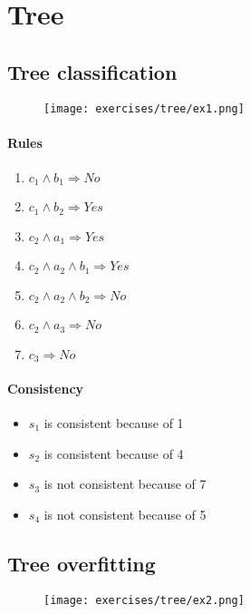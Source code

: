 \section{Tree}

\subsection{Tree classification}
\begin{figure}[H]
    \centering
    \texttt{[image: exercises/tree/ex1.png]}
\end{figure}

\paragraph{Rules}
\begin{enumerate}

\item $c_1 \wedge b_1 \Rightarrow No $
\item $c_1 \wedge b_2 \Rightarrow Yes $
\item $c_2 \wedge a_1 \Rightarrow Yes $
\item $c_2 \wedge a_2 \wedge b_1 \Rightarrow Yes $
\item $c_2 \wedge a_2 \wedge b_2 \Rightarrow No $
\item $c_2 \wedge a_3 \Rightarrow No $
\item $c_3  \Rightarrow No $
\end{enumerate}

\paragraph{Consistency}
\begin{itemize}
\item $s_1$ is consistent because of  1 
\item $s_2$ is consistent because of  4
\item $s_3$ is not consistent because of  7 
\item $s_4$ is not consistent because of  5
\end{itemize}

\subsection{Tree overfitting}
\begin{figure}[H]
    \centering
    \texttt{[image: exercises/tree/ex2.png]}
\end{figure}

